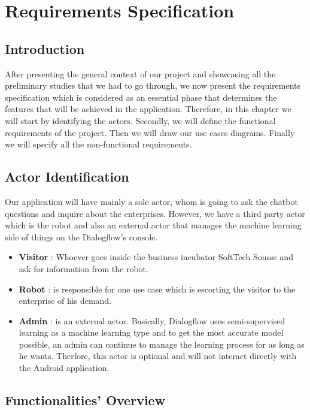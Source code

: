 
\chapter{Requirements Specification} %

\label{Chapter3} %

\section{Introduction}
After presenting the general context of our project and showcasing all the preliminary studies that we had to go through, we now present the requirements specification which is considered as an essential phase that determines the features that will be achieved in the application. Therefore, in this chapter we will start by identifying the actors. Secondly, we will define the functional requirements of the project. Then we will draw our use cases diagrams. Finally we will specify all the non-functional requirements.
\section{Actor Identification}
Our application will have mainly a sole actor, whom is going to ask the chatbot questions and inquire about the enterprises. However, we have a third party actor which is the robot and also an external actor that manages the machine learning side of things on the Dialogflow's console.
\begin{itemize}
    \item \textbf{Visitor} : Whoever goes inside the business incubator SoftTech Sousse and ask for information from the robot.
    \item \textbf{Robot} : is responsible for one use case which is escorting the visitor to the enterprise of his demand.  
    \item \textbf{Admin} : is an external actor. Basically, Dialogflow uses semi-supervised learning as a machine learning type and to get the most accurate model possible, an admin can continue to manage the learning process for as long as he wants. Therfore, this actor is optional and will not interact directly with the Android application. 
\end{itemize}
\section{Functionalities' Overview}
